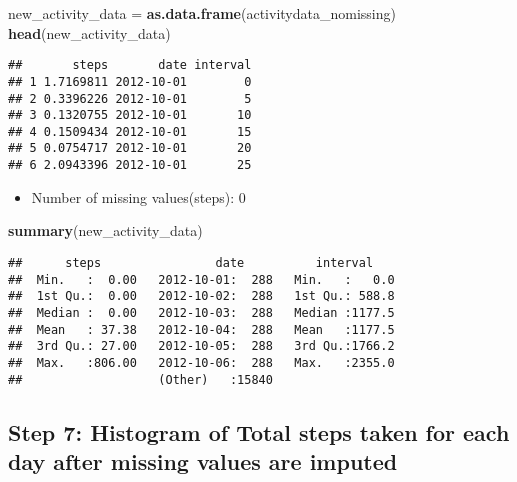 \documentclass[]{article}
\newenvironment{Shaded}{\begin{snugshade}}{\end{snugshade}}
\newcommand{\KeywordTok}[1]{\textcolor[rgb]{0.13,0.29,0.53}{\textbf{#1}}}
\newcommand{\NormalTok}[1]{#1}
\newcommand{\OperatorTok}[1]{\textcolor[rgb]{0.81,0.36,0.00}{\textbf{#1}}}
\newcommand{\StringTok}[1]{\textcolor[rgb]{0.31,0.60,0.02}{#1}}
\providecommand{\tightlist}{%
  \setlength{\itemsep}{0pt}\setlength{\parskip}{0pt}}
\begin{document}
\begin{Shaded}
\begin{Highlighting}[]
\NormalTok{new_activity_data =}\StringTok{ }\KeywordTok{as.data.frame}\NormalTok{(activitydata_nomissing)}
\KeywordTok{head}\NormalTok{(new_activity_data)}
\end{Highlighting}
\end{Shaded}

\begin{verbatim}
##       steps       date interval
## 1 1.7169811 2012-10-01        0
## 2 0.3396226 2012-10-01        5
## 3 0.1320755 2012-10-01       10
## 4 0.1509434 2012-10-01       15
## 5 0.0754717 2012-10-01       20
## 6 2.0943396 2012-10-01       25
\end{verbatim}

\begin{Shaded}
\end{Shaded}

\begin{itemize}
\tightlist
\item
  Number of missing values(steps): 0
\end{itemize}

\begin{Shaded}
\begin{Highlighting}[]
\KeywordTok{summary}\NormalTok{(new_activity_data)}
\end{Highlighting}
\end{Shaded}

\begin{verbatim}
##      steps                date          interval     
##  Min.   :  0.00   2012-10-01:  288   Min.   :   0.0  
##  1st Qu.:  0.00   2012-10-02:  288   1st Qu.: 588.8  
##  Median :  0.00   2012-10-03:  288   Median :1177.5  
##  Mean   : 37.38   2012-10-04:  288   Mean   :1177.5  
##  3rd Qu.: 27.00   2012-10-05:  288   3rd Qu.:1766.2  
##  Max.   :806.00   2012-10-06:  288   Max.   :2355.0  
##                   (Other)   :15840
\end{verbatim}

\hypertarget{step-7-histogram-of-total-steps-taken-for-each-day-after-missing-values-are-imputed}{%
\subsection{Step 7: Histogram of Total steps taken for each day after
missing values are
imputed}\label{step-7-histogram-of-total-steps-taken-for-each-day-after-missing-values-are-imputed}}
\end{document}
